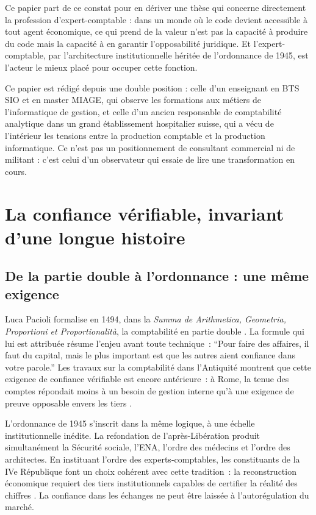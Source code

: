 \documentclass[12pt,a4paper]{article}
\begin{document}
Ce papier part de ce constat pour en dériver une thèse qui concerne directement la profession d'expert-comptable : dans un monde où le code devient accessible à tout agent économique, ce qui prend de la valeur n'est pas la capacité à produire du code mais la capacité à en garantir l'opposabilité juridique. Et l'expert-comptable, par l'architecture institutionnelle héritée de l'ordonnance de 1945, est l'acteur le mieux placé pour occuper cette fonction.

Ce papier est rédigé depuis une double position : celle d'un enseignant en BTS SIO et en master MIAGE, qui observe les formations aux métiers de l'informatique de gestion, et celle d'un ancien responsable de comptabilité analytique dans un grand établissement hospitalier suisse, qui a vécu de l'intérieur les tensions entre la production comptable et la production informatique. Ce n'est pas un positionnement de consultant commercial ni de militant : c'est celui d'un observateur qui essaie de lire une transformation en cours.

\section{La confiance vérifiable, invariant d'une longue histoire}

\subsection{De la partie double à l'ordonnance : une même exigence}

Luca Pacioli formalise en 1494, dans la \emph{Summa de Arithmetica, Geometria, Proportioni et Proportionalità}, la comptabilité en partie double \parencite{pacioli1494}. La formule qui lui est attribuée résume l'enjeu avant toute technique~: \enquote{Pour faire des affaires, il faut du capital, mais le plus important est que les autres aient confiance dans votre parole.} Les travaux sur la comptabilité dans l'Antiquité montrent que cette exigence de confiance vérifiable est encore antérieure~: à Rome, la tenue des comptes répondait moins à un besoin de gestion interne qu'à une exigence de preuve opposable envers les tiers \parencite{minaud2006}.

L'ordonnance de 1945 s'inscrit dans la même logique, à une échelle institutionnelle inédite. La refondation de l'après-Libération produit simultanément la Sécurité sociale, l'ENA, l'ordre des médecins et l'ordre des architectes. En instituant l'ordre des experts-comptables, les constituants de la IVe République font un choix cohérent avec cette tradition~: la reconstruction économique requiert des tiers institutionnels capables de certifier la réalité des chiffres \parencite{ordonnance1945}. La confiance dans les échanges ne peut être laissée à l'autorégulation du marché.
\end{document}

